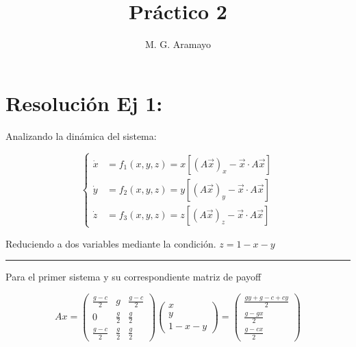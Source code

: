 \documentclass[twocolumn,aps,prl]{revtex4-1}
\newcommand*\sepline{%
  \begin{center}
    \rule[1ex]{.5\textwidth}{.5pt}
  \end{center}}
\begin{document}

\title{Práctico 2}
\author{M. G. Aramayo}


\maketitle



\section{Resolución Ej 1:}




Analizando la dinámica del sistema:

$$ \left\lbrace
\begin{aligned}
  \dot{x} &= f_1(x,y,z) = x \left[(A \vec{x})_{x}-\vec{x} \cdot A \vec{x}\right] \\
  \dot{y} &= f_2(x,y,z) = y \left[(A \vec{x})_{y}-\vec{x} \cdot A \vec{x}\right] \\
  \dot{z} &= f_3(x,y,z) = z \left[(A \vec{x})_{z}-\vec{x} \cdot A \vec{x}\right]
\end{aligned}
\right.
$$

Reduciendo a dos variables mediante la condición. $z = 1-x-y$

\sepline

Para el primer sistema y su correspondiente matriz de payoff

$$
Ax = 
\begin{pmatrix}
    \frac{g-c}{2}&g&\frac{g-c}{2}\\
    0&\frac{g}{2}&\frac{g}{2}\\
    \frac{g-c}{2}&\frac{g}{2}&\frac{g}{2}
\end{pmatrix}
\begin{pmatrix}
    x\\
    y\\ 
    1-x-y
\end{pmatrix}
=
\begin{pmatrix}
    \frac{gy+g-c+cy}{2}\\ 
    \frac{g-gx}{2}\\ 
    \frac{g-cx}{2}
\end{pmatrix}
$$
\end{document}
